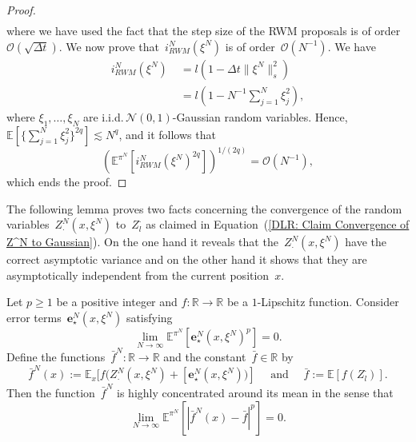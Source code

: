 \begin{proof}
\begin{align*}
\end{align*}
where we have used the fact that the step size of the RWM proposals is of order~$\mathcal{O}(\sqrt{\Delta t})$. We now prove that~$i^N_{RWM}( \xi^N)$ is of order~$\mathcal{O}(N^{-1})$. We have
\begin{equation*}
  \begin{split}
   i^N_{RWM}( \xi^N) & \; = l (1 -  \Delta t \| \xi^N\|_{s}^2) \\
   & \; = l( 1 -  N^{-1} \sum_{j = 1}^{N} \xi_j^2 ),
  \end{split}
\end{equation*}
where $ \xi_1, \dots , \xi_N $ are i.i.d.\,$\mathcal{N}(0,1)$-Gaussian random variables. Hence, $ \mathbb{E}[\{ \sum_{j = 1}^{N} \xi_j^2  \}^{2q}] \lesssim N^q$, and it follows that
\begin{equation*}
  \left( \mathbb{E}^{\pi^N}[ i^N_{RWM}( \xi^N)^{2q} ] \right)^{1/(2q)} = \mathcal{O}(N^{-1}),
\end{equation*}
which ends the proof.
  
\end{proof}


The following lemma proves two facts concerning the convergence of the random variables~$ Z^N_{\cdot} (x, \xi^N) $ to~$Z_l^{\cdot}$ as claimed in Equation~(\ref{DLR: Claim Convergence of Z^N to Gaussian}). On the one hand it reveals that the~$Z^N_{\cdot} (x, \xi^N)$ have the correct asymptotic variance and  on the other hand it shows that they are asymptotically independent from the current position~$x$.
      
\begin{lemma}\autocite[Lemma 4.5]{Pillai2012}
  \label{DLR: Lemma: Convergence of Z^N to Gaussian}
 Let $p \geq 1$ be a positive integer and $f : \mathbb{R} \to \mathbb{R}$ be a $1$-Lipschitz function. Consider error terms~$\textbf{e}^N_{\star}(x, \xi^N)$ satisfying
 \begin{equation*}
   \lim_{N \to \infty} \mathbb{E}^{\pi^N}[\textbf{e}^N_{\star}(x, \xi^N)^p] = 0.
 \end{equation*}
 Define the functions~$\bar{f}^N: \mathbb{R} \to \mathbb{R}$ and the constant~$\bar{f} \in \mathbb{R}$ by
 \begin{equation*}
   \bar{f}^N (x) := \mathbb{E}_x[f(Z^N_{\cdot} (x, \xi^N) + [\textbf{e}^N_{\star}(x, \xi^N))] \quad \text{ and } \quad \bar{f} := \mathbb{E}[f(Z_l^{\cdot})].
 \end{equation*}
 Then the function~$\bar{f}^N$ is highly concentrated around its mean in the sense that
 \begin{equation*}
   \lim_{N \to \infty} \mathbb{E}^{\pi^N}[|\bar{f}^N(x) - \bar{f}|^p] = 0.
 \end{equation*}

\end{lemma}

